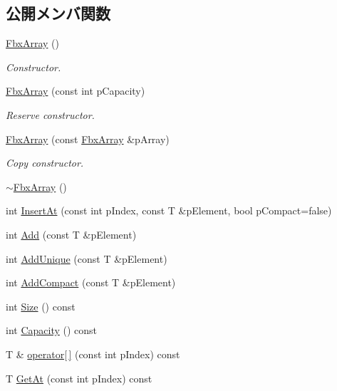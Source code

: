 \subsection*{公開メンバ関数}
\begin{DoxyCompactItemize}
\item 
\hyperlink{class_fbx_array_a423ab605db86db1663db8b35043f6f9d}{Fbx\+Array} ()
\begin{DoxyCompactList}\small\item\em Constructor. \end{DoxyCompactList}\item 
\hyperlink{class_fbx_array_ac3a4674fa57256ad8be76d3d815cd5be}{Fbx\+Array} (const int p\+Capacity)
\begin{DoxyCompactList}\small\item\em Reserve constructor. \end{DoxyCompactList}\item 
\hyperlink{class_fbx_array_a2ec010767ac567804d4c4174048133b3}{Fbx\+Array} (const \hyperlink{class_fbx_array}{Fbx\+Array} \&p\+Array)
\begin{DoxyCompactList}\small\item\em Copy constructor. \end{DoxyCompactList}\item 
\hyperlink{class_fbx_array_aa059390701fad11dba2a073240480e1c}{$\sim$\+Fbx\+Array} ()
\item 
int \hyperlink{class_fbx_array_a6472793a9542877d9179f729f09521a8}{Insert\+At} (const int p\+Index, const T \&p\+Element, bool p\+Compact=false)
\item 
int \hyperlink{class_fbx_array_aad977e99a3924f6cd758f90c26435d21}{Add} (const T \&p\+Element)
\item 
int \hyperlink{class_fbx_array_a30f56716ede895f07b7b6ed59a889623}{Add\+Unique} (const T \&p\+Element)
\item 
int \hyperlink{class_fbx_array_a7d59d8f9f24a1cc2092aac057bb12213}{Add\+Compact} (const T \&p\+Element)
\item 
int \hyperlink{class_fbx_array_aa76a0ceaf4b13a2acec7c0cdd1c08362}{Size} () const
\item 
int \hyperlink{class_fbx_array_a5f9ef2d46a1176800ca5a95b760ebaab}{Capacity} () const
\item 
T \& \hyperlink{class_fbx_array_a163616f4c5bedff84cb6f7f1f8471eb8}{operator\mbox{[}$\,$\mbox{]}} (const int p\+Index) const
\item 
T \hyperlink{class_fbx_array_a868a1b5f4ee06544665040c08d1dd3ce}{Get\+At} (const int p\+Index) const

\end{DoxyCompactItemize}
